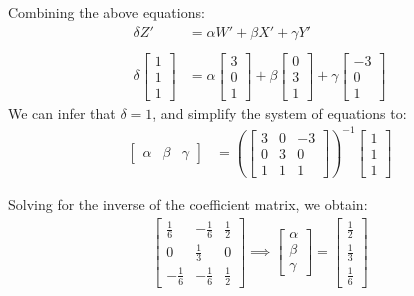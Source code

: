\documentclass[12pt, oneside]{article}
\begin{document}
Combining the above equations:
\begin{align*}
\delta Z' &= \alpha W' + \beta X' + \gamma Y' \\ \\
\delta  \begin{bmatrix}
1 		\\
1 		\\
1		
\end{bmatrix}  &= \alpha  \begin{bmatrix}
3		\\
0 		\\
1		
\end{bmatrix} +
\beta \begin{bmatrix}
0 		\\
3 		\\
1		
\end{bmatrix} + \gamma  \begin{bmatrix}
-3 		\\
0 		\\
1		
\end{bmatrix} 
\end{align*} 
We can infer that $\delta = 1$, and simplify the system of equations to:
\begin{align*}
\begin{bmatrix}
\alpha & \beta & \gamma
\end{bmatrix}  &= \left(\begin{bmatrix}
3 & 0 & -3 		\\
0 & 3  & 0		\\
1 & 1  & 1	
\end{bmatrix} \right) ^{-1}
\begin{bmatrix}
1		\\
1 		\\
1		
\end{bmatrix}
\end{align*} 

Solving for the inverse of the coefficient matrix, we obtain:
\begin{align*}
\begin{bmatrix}
\frac{1}{6} & -\frac{1}{6} & \frac{1}{2}	\\
0 & \frac{1}{3} & 0		\\
-\frac{1}{6}  & -\frac{1}{6}  & \frac{1}{2}	
\end{bmatrix} \implies 
\begin{bmatrix}
\alpha \\
\beta \\
\gamma
\end{bmatrix} = 
\begin{bmatrix}
\frac{1}{2} \\
\frac{1}{3} \\
\frac{1}{6}
\end{bmatrix} 
\end{align*}
\end{document}
